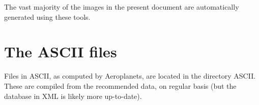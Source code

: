 The vast majority of the images in the present document are automatically generated using these tools.

\section{The ASCII files}

Files in ASCII, as computed by Aeroplanets, are located in the directory ASCII. These are compiled from the recommended data, on regular basis (but the database in XML is likely more up-to-date).








